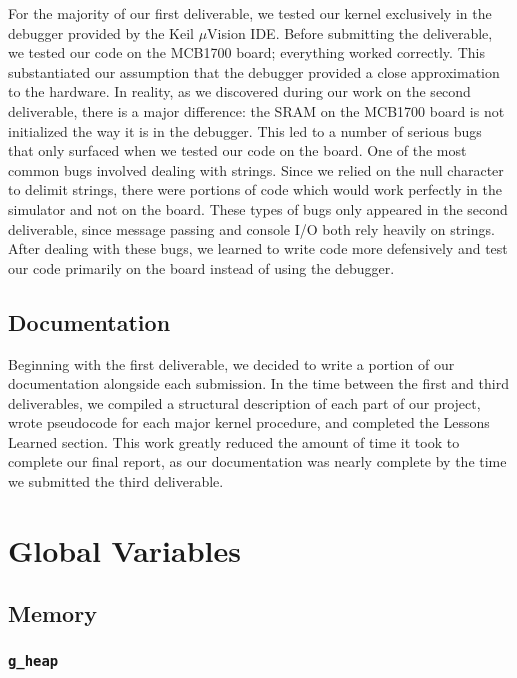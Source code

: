 \documentclass[12pt]{report}
\begin{document}
For the majority of our first deliverable, we tested our kernel exclusively in the debugger provided by the Keil $\mu$Vision IDE. Before submitting the deliverable, we tested our code on the MCB1700 board; everything worked correctly. This substantiated our assumption that the debugger provided a close approximation to the hardware. In reality, as we discovered during our work on the second deliverable, there is a major difference: the SRAM on the MCB1700 board is not initialized the way it is in the debugger. This led to a number of serious bugs that only surfaced when we tested our code on the board. One of the most common bugs involved dealing with strings. Since we relied on the null character to delimit strings, there were portions of code which would work perfectly in the simulator and not on the board. These types of bugs only appeared in the second deliverable, since message passing and console I/O both rely heavily on strings. After dealing with these bugs, we learned to write code more defensively and test our code primarily on the board instead of using the debugger.

\section{Documentation}

Beginning with the first deliverable, we decided to write a portion of our documentation alongside each submission. In the time between the first and third deliverables, we compiled a structural description of each part of our project, wrote pseudocode for each major kernel procedure, and completed the Lessons Learned section. This work greatly reduced the amount of time it took to complete our final report, as our documentation was nearly complete by the time we submitted the third deliverable.

\appendix


\chapter{Global Variables}

\section{Memory}

\subsection{\texttt{g_heap}}
\end{document}
